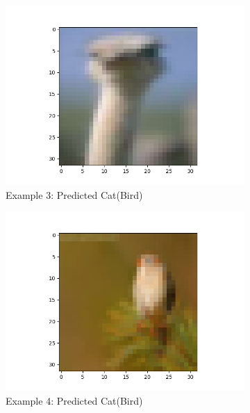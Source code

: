 \documentclass[11pt]{article}
\begin{document}
\begin{figure}[H]
\begin{subfigure}[b]{0.3\textwidth}
        \includegraphics[width=\linewidth]{misB3.png}
        \caption{Example 3: Predicted Cat(Bird)}
    \end{subfigure} 
    \medskip
    \begin{subfigure}[b]{0.3\textwidth}
        \centering
        \includegraphics[width=\linewidth]{misB4.png}
        \caption{Example 4: Predicted Cat(Bird)}
    \end{subfigure}
    \begin{subfigure}[b]{0.3\textwidth}
        \centering

\end{subfigure}
\end{figure}
\end{document}
